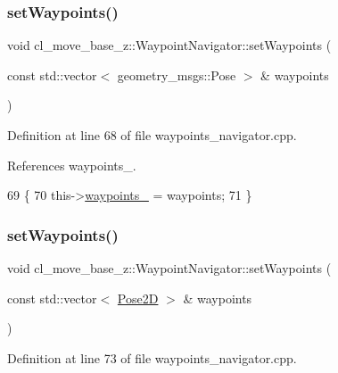 \subsubsection{\texorpdfstring{set\+Waypoints()}{setWaypoints()}\hspace{0.1cm}{\footnotesize\ttfamily [1/2]}}
{\footnotesize\ttfamily void cl\+\_\+move\+\_\+base\+\_\+z\+::\+Waypoint\+Navigator\+::set\+Waypoints (\begin{DoxyParamCaption}\item[{const std\+::vector$<$ geometry\+\_\+msgs\+::\+Pose $>$ \&}]{waypoints }\end{DoxyParamCaption})}



Definition at line 68 of file waypoints\+\_\+navigator.\+cpp.



References waypoints\+\_\+.


\begin{DoxyCode}
69 \{
70   this->\hyperlink{classcl__move__base__z_1_1WaypointNavigator_a727f6a73e15ff5dc6bb3ffdf52c3d832}{waypoints\_} = waypoints;
71 \}
\end{DoxyCode}
\mbox{\label{classcl__move__base__z_1_1WaypointNavigator_aa164ff2510b9549b0b73df6eb18a7a4f}} 
\subsubsection{\texorpdfstring{set\+Waypoints()}{setWaypoints()}\hspace{0.1cm}{\footnotesize\ttfamily [2/2]}}
{\footnotesize\ttfamily void cl\+\_\+move\+\_\+base\+\_\+z\+::\+Waypoint\+Navigator\+::set\+Waypoints (\begin{DoxyParamCaption}\item[{const std\+::vector$<$ \hyperlink{structcl__move__base__z_1_1Pose2D}{Pose2D} $>$ \&}]{waypoints }\end{DoxyParamCaption})}



Definition at line 73 of file waypoints\+\_\+navigator.\+cpp.



